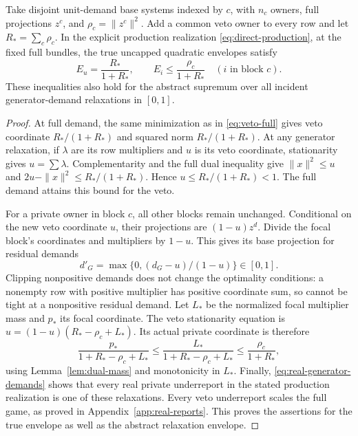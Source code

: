 \begin{lemma}
\label{lem:veto-cap}
Take disjoint unit-demand base systems indexed by $c$, with $n_c$ owners,
full projections $z^c$, and $\rho_c=\|z^c\|^2$.  Add a common veto owner
to every row and let $R_* =\sum_c\rho_c$.  In the explicit production
realization \eqref{eq:direct-production}, at the fixed full bundles,
the true uncapped quadratic envelopes satisfy
\begin{equation}
 E_u=\frac{R_*}{1+R_*},\qquad
 E_i\le\frac{\rho_c}{1+R_*}\quad(i\text{ in block }c).
 \label{eq:class-cap}
\end{equation}
These inequalities also hold for the abstract supremum over all
incident generator-demand relaxations in $[0,1]$.
\end{lemma}
\begin{proof}
At full demand, the same minimization as in \eqref{eq:veto-full} gives
veto coordinate $R_* /(1+R_*)$ and squared norm $R_* /(1+R_*)$.
At any generator relaxation, if $\lambda$ are its row multipliers and
$u$ is its veto coordinate, stationarity gives $u=\sum\lambda$.
Complementarity and the full dual inequality give
$\|x\|^2\le u$ and $2u-\|x\|^2\le R_* /(1+R_*)$.
Hence $u\le R_* /(1+R_*)<1$.  The full demand attains this bound for the
veto.

For a private owner in block $c$, all other blocks remain unchanged.
Conditional on the new veto coordinate $u$, their projections are
$(1-u)z^d$.  Divide the focal block's coordinates and multipliers by
$1-u$.  This gives its base projection for residual demands
\[
 d'_G=\max\{0,(d_G-u)/(1-u)\}\in[0,1].
\]
Clipping nonpositive demands does not change the optimality conditions:
a nonempty row with positive multiplier has positive coordinate sum,
so cannot be tight at a nonpositive residual demand.  Let $L_*$ be the
normalized focal multiplier mass and $p_*$ its focal coordinate.
The veto stationarity equation is
$u=(1-u)(R_* -\rho_c+L_*)$.  Its actual private coordinate is therefore
\[
 \frac{p_*}{1+R_* -\rho_c+L_*}
 \le\frac{L_*}{1+R_* -\rho_c+L_*}
 \le\frac{\rho_c}{1+R_*},
\]
using Lemma~\ref{lem:dual-mass} and monotonicity in $L_*$.  Finally,
\eqref{eq:real-generator-demands} shows that every real private
underreport in the stated production realization is one of these
relaxations.  Every veto underreport scales the full game, as proved
in Appendix~\ref{app:real-reports}.  This proves the assertions for the
true envelope as well as the abstract relaxation envelope.
\end{proof}

